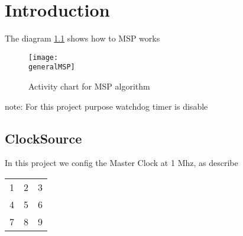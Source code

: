 \chapter{Introduction}

\newcommand{\generalMSP}{~/Documents/EmbeddedSW/PulMar/out/Documentation/MSPGeneral/MSPGeneral.png}

The diagram \ref{fig:generalMSP} shows how to MSP works\par
\begin{figure}[h]
  \centering
  \texttt{[image: \\generalMSP]} 
  \caption{Activity chart for MSP algorithm}
  \label{fig:generalMSP}
\end{figure}

note: For this project purpose watchdog timer is disable

\section{ClockSource}
In this project we config the Master Clock at 1 Mhz, as describe\par
\begin{tabular}{ l c r }
  1 & 2 & 3 \\
  4 & 5 & 6 \\
  7 & 8 & 9 \\
\end{tabular}
